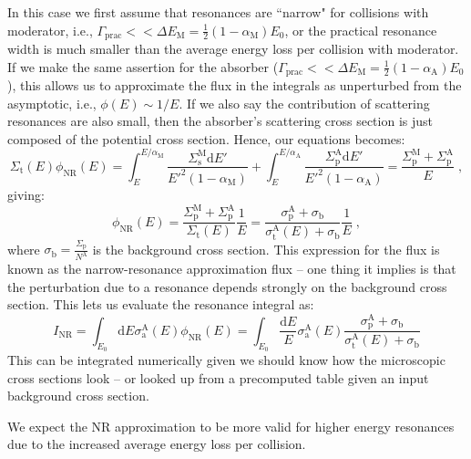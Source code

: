 In this case we first assume that resonances are ``narrow" for collisions with moderator, i.e., $\Gamma_\mathrm{prac}<< \Delta E_\mathrm{M} = \frac{1}{2}(1-\alpha_\mathrm{M})E_0$, or the practical resonance width is much smaller than the average energy loss per collision with moderator. If we make the same assertion for the absorber ($\Gamma_\mathrm{prac}<< \Delta E_\mathrm{M} = \frac{1}{2}(1-\alpha_\mathrm{A})E_0$), this allows us to approximate the flux in the integrals as unperturbed from the asymptotic, i.e., $\phi(E) \sim 1/E$. If we also say the contribution of scattering resonances are also small, then the absorber's scattering cross section is just composed of the potential cross section. Hence, our equations becomes:
\begin{equation*}
     \Sigma_\mathrm{t}(E)\phi_\mathrm{NR}(E) = \int^{E/\alpha_\mathrm{M}}_E \frac{\Sigma^\mathrm{M}_\mathrm{s}\mathrm{d}E'}{E'^2(1-\alpha_\mathrm{M})} + \int^{E/\alpha_\mathrm{A}}_E \frac{\Sigma^\mathrm{A}_\mathrm{p}\mathrm{d}E'}{E'^2(1-\alpha_\mathrm{A})}= \frac{\Sigma^\mathrm{M}_\mathrm{p} + \Sigma^\mathrm{A}_\mathrm{p}}{E}\;\mathrm{,}
\end{equation*}
giving:
\begin{equation*}
    \phi_\mathrm{NR}(E) = \frac{\Sigma^\mathrm{M}_\mathrm{p} + \Sigma^\mathrm{A}_\mathrm{p}}{\Sigma_\mathrm{t}(E)}\frac{1}{E} = \frac{\sigma^\mathrm{A}_\mathrm{p} + \sigma_\mathrm{b}}{\sigma^\mathrm{A}_\mathrm{t}(E) + \sigma_\mathrm{b}}\frac{1}{E}\;\mathrm{,}
\end{equation*}
where $\sigma_\mathrm{b} = \frac{\Sigma_\mathrm{p}}{N^\mathrm{A}}$ is the background cross section. This expression for the flux is known as the narrow-resonance approximation flux -- one thing it implies is that the perturbation due to a resonance depends strongly on the background cross section. This lets us evaluate the resonance integral as:
\begin{equation*}
    I_\mathrm{NR} = \int_{E_0}\mathrm{d}E \sigma^\mathrm{A}_\mathrm{a}(E)\phi_\mathrm{NR}(E) = \int_{E_0}\frac{\mathrm{d}E}{E}\sigma^\mathrm{A}_\mathrm{a}(E)\frac{\sigma^\mathrm{A}_\mathrm{p} + \sigma_\mathrm{b}}{\sigma^\mathrm{A}_\mathrm{t}(E) + \sigma_\mathrm{b}}
\end{equation*}
This can be integrated numerically given we should know how the microscopic cross sections look -- or looked up from a precomputed table given an input background cross section.

We expect the NR approximation to be more valid for higher energy resonances due to the increased average energy loss per collision. %


